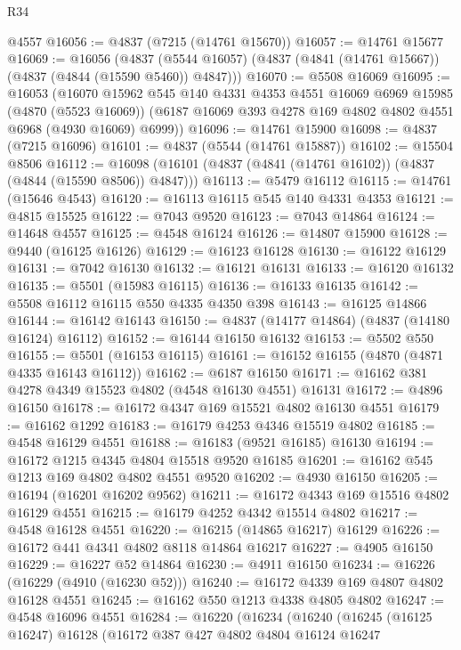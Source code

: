 \begin{lexlean}{R34}
\begin{coremodule}
    @4557
@16056 := @4837 (@7215 (@14761 @15670))
@16057 := @14761 @15677
@16069 := @16056
    (@4837 (@5544 @16057) (@4837 (@4841 (@14761 @15667)) (@4837 (@4844 (@15590 @5460)) @4847)))
@16070 := @5508 @16069
@16095 := @16053
    (@16070
      @15962
      @545
      @140
      @4331
      @4353
      @4551
      @16069
      @6969
      @15985
      (@4870 (@5523 @16069))
      (@6187 @16069 @393 @4278 @169 @4802 @4802 @4551 @6968 (@4930 @16069) @6999))
@16096 := @14761 @15900
@16098 := @4837 (@7215 @16096)
@16101 := @4837 (@5544 (@14761 @15887))
@16102 := @15504 @8506
@16112 := @16098 (@16101 (@4837 (@4841 (@14761 @16102)) (@4837 (@4844 (@15590 @8506)) @4847)))
@16113 := @5479 @16112
@16115 := @14761 (@15646 @4543)
@16120 := @16113 @16115 @545 @140 @4331 @4353
@16121 := @4815 @15525
@16122 := @7043 @9520
@16123 := @7043 @14864
@16124 := @14648 @4557
@16125 := @4548 @16124
@16126 := @14807 @15900
@16128 := @9440 (@16125 @16126)
@16129 := @16123 @16128
@16130 := @16122 @16129
@16131 := @7042 @16130
@16132 := @16121 @16131
@16133 := @16120 @16132
@16135 := @5501 (@15983 @16115)
@16136 := @16133 @16135
@16142 := @5508 @16112 @16115 @550 @4335 @4350 @398
@16143 := @16125 @14866
@16144 := @16142 @16143
@16150 := @4837 (@14177 @14864) (@4837 (@14180 @16124) @16112)
@16152 := @16144 @16150 @16132
@16153 := @5502 @550
@16155 := @5501 (@16153 @16115)
@16161 := @16152 @16155 (@4870 (@4871 @4335 @16143 @16112))
@16162 := @6187 @16150
@16171 := @16162 @381 @4278 @4349 @15523 @4802 (@4548 @16130 @4551) @16131
@16172 := @4896 @16150
@16178 := @16172 @4347 @169 @15521 @4802 @16130 @4551
@16179 := @16162 @1292
@16183 := @16179 @4253 @4346 @15519 @4802
@16185 := @4548 @16129 @4551
@16188 := @16183 (@9521 @16185) @16130
@16194 := @16172 @1215 @4345 @4804 @15518 @9520 @16185
@16201 := @16162 @545 @1213 @169 @4802 @4802 @4551 @9520
@16202 := @4930 @16150
@16205 := @16194 (@16201 @16202 @9562)
@16211 := @16172 @4343 @169 @15516 @4802 @16129 @4551
@16215 := @16179 @4252 @4342 @15514 @4802
@16217 := @4548 @16128 @4551
@16220 := @16215 (@14865 @16217) @16129
@16226 := @16172 @441 @4341 @4802 @8118 @14864 @16217
@16227 := @4905 @16150
@16229 := @16227 @52 @14864
@16230 := @4911 @16150
@16234 := @16226 (@16229 (@4910 (@16230 @52)))
@16240 := @16172 @4339 @169 @4807 @4802 @16128 @4551
@16245 := @16162 @550 @1213 @4338 @4805 @4802
@16247 := @4548 @16096 @4551
@16284 := @16220
    (@16234
      (@16240
        (@16245
          (@16125 @16247)
          @16128
          (@16172
            @387
            @427
            @4802
            @4804
            @16124
            @16247

\end{coremodule}
\end{lexlean}
